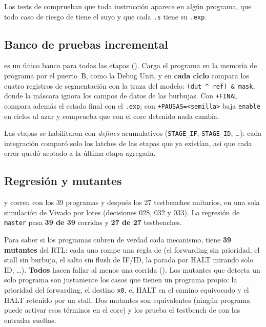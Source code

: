 Los tests de  comprueban que toda instrucción aparece en algún programa, que todo caso de
riesgo de  tiene el suyo y que cada \texttt{.s} tiene su \texttt{.exp}.

\subsection{Banco de pruebas incremental}

 es un único banco para todas las etapas
(). Carga el programa en la memoria de programa por el puerto~B, como la Debug Unit,
y en \textbf{cada ciclo} compara los cuatro registros de segmentación con la traza del modelo:
\texttt{(dut \^{} ref) \& mask}, donde la máscara ignora los campos de datos de las burbujas. Con
\texttt{+FINAL} compara además el estado final con el \texttt{.exp}; con \texttt{+PAUSAS=<semilla>}
baja \texttt{enable} en ciclos al azar y comprueba que con el core detenido nada cambia.

Las etapas se habilitaron con \emph{defines} acumulativos (\texttt{STAGE\_IF}, \texttt{STAGE\_ID},
\ldots): cada integración comparó solo los latches de las etapas que ya existían, así que cada error
quedó acotado a la última etapa agregada.

\subsection{Regresión y mutantes}

 y  corren  con los 39 programas y
después los 27 testbenches unitarios, en una sola simulación de Vivado por lotes (decisiones 028,
032 y 033). La regresión de \texttt{master} pasa \textbf{39 de 39} corridas y \textbf{27 de 27}
testbenches.

Para saber si los programas cubren de verdad cada mecanismo,  tiene
\textbf{39 mutantes} del RTL: cada uno rompe una regla de  (el forwarding sin
prioridad, el stall sin burbuja, el salto sin flush de IF/ID, la parada por HALT mirando solo ID,
\ldots). \textbf{Todos} hacen fallar al menos una corrida (). Los mutantes que detecta
un solo programa son justamente los casos que tienen un programa propio: la prioridad del
forwarding, el destino \texttt{x0}, el HALT en el camino equivocado y el HALT retenido por un
stall. Dos mutantes son equivalentes (ningún programa puede activar esos términos en el core) y los
prueba el testbench de  con las entradas sueltas.

